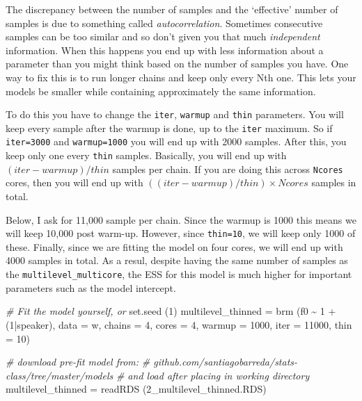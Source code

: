 \documentclass[
]{book}
\newenvironment{Shaded}{\begin{snugshade}}{\end{snugshade}}
\newcommand{\AttributeTok}[1]{\textcolor[rgb]{0.77,0.63,0.00}{#1}}
\newcommand{\CommentTok}[1]{\textcolor[rgb]{0.56,0.35,0.01}{\textit{#1}}}
\newcommand{\DecValTok}[1]{\textcolor[rgb]{0.00,0.00,0.81}{#1}}
\newcommand{\FunctionTok}[1]{\textcolor[rgb]{0.00,0.00,0.00}{#1}}
\newcommand{\NormalTok}[1]{#1}
\newcommand{\OtherTok}[1]{\textcolor[rgb]{0.56,0.35,0.01}{#1}}
\newcommand{\SpecialCharTok}[1]{\textcolor[rgb]{0.00,0.00,0.00}{#1}}
\newcommand{\StringTok}[1]{\textcolor[rgb]{0.31,0.60,0.02}{#1}}
\begin{document}
The discrepancy between the number of samples and the `effective' number of samples is due to something called \emph{autocorrelation}. Sometimes consecutive samples can be too similar and so don't given you that much \emph{independent} information. When this happens you end up with less information about a parameter than you might think based on the number of samples you have. One way to fix this is to run longer chains and keep only every Nth one. This lets your models be smaller while containing approximately the same information.

To do this you have to change the \texttt{iter}, \texttt{warmup} and \texttt{thin} parameters. You will keep every sample after the warmup is done, up to the \texttt{iter} maximum. So if \texttt{iter=3000} and \texttt{warmup=1000} you will end up with 2000 samples. After this, you keep only one every \texttt{thin} samples. Basically, you will end up with \((iter-warmup) / thin\) samples per chain. If you are doing this across \texttt{Ncores} cores, then you will end up with \(((iter-warmup) / thin) \times Ncores\) samples in total.

Below, I ask for 11,000 sample per chain. Since the warmup is 1000 this means we will keep 10,000 post warm-up. However, since \texttt{thin=10}, we will keep only 1000 of these. Finally, since we are fitting the model on four cores, we will end up with 4000 samples in total. As a resul, despite having the same number of samples as the \texttt{multilevel\_multicore}, the ESS for this model is much higher for important parameters such as the model intercept.

\begin{Shaded}
\begin{Highlighting}[]
\CommentTok{\# Fit the model yourself, or}
\FunctionTok{set.seed}\NormalTok{ (}\DecValTok{1}\NormalTok{)}
\NormalTok{multilevel\_thinned }\OtherTok{=}  
  \FunctionTok{brm}\NormalTok{ (f0 }\SpecialCharTok{\textasciitilde{}} \DecValTok{1} \SpecialCharTok{+}\NormalTok{ (}\DecValTok{1}\SpecialCharTok{|}\NormalTok{speaker), }\AttributeTok{data =}\NormalTok{ w, }\AttributeTok{chains =} \DecValTok{4}\NormalTok{, }\AttributeTok{cores =} \DecValTok{4}\NormalTok{,}
       \AttributeTok{warmup =} \DecValTok{1000}\NormalTok{, }\AttributeTok{iter =} \DecValTok{11000}\NormalTok{, }\AttributeTok{thin =} \DecValTok{10}\NormalTok{)}

\CommentTok{\# download pre{-}fit model from: }
\CommentTok{\# github.com/santiagobarreda/stats{-}class/tree/master/models}
\CommentTok{\# and load after placing in working directory}
\NormalTok{multilevel\_thinned }\OtherTok{=} \FunctionTok{readRDS}\NormalTok{ (}\StringTok{\textquotesingle{}2\_multilevel\_thinned.RDS\textquotesingle{}}\NormalTok{)}
\end{Highlighting}
\end{Shaded}
\end{document}
